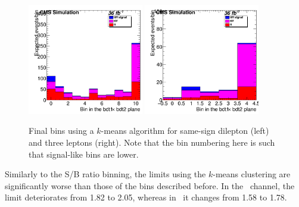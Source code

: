 \begin{figure} [!h]
 \centering
 \includegraphics[width=0.45\textwidth]{figures/binning/recursiveNoOrdering_2l_trial0.png}
 \includegraphics[width=0.45\textwidth]{figures/binning/recursiveNoOrdering_3l_trial0.png}
\caption{Final bins using a $k$-means algorithm for same-sign dilepton (left) and three leptons (right). Note that the bin numbering here is such that signal-like bins are lower.}
\label{fig:kmeansfinalbins}
\end{figure}

Similarly to the S/B ratio binning, the limits using the $k$-means clustering are significantly worse than those of the bins described before.
In the \mumu\ channel, the limit deteriorates from 1.82 to 2.05, whereas in \threel\ it changes from 1.58 to 1.78.
